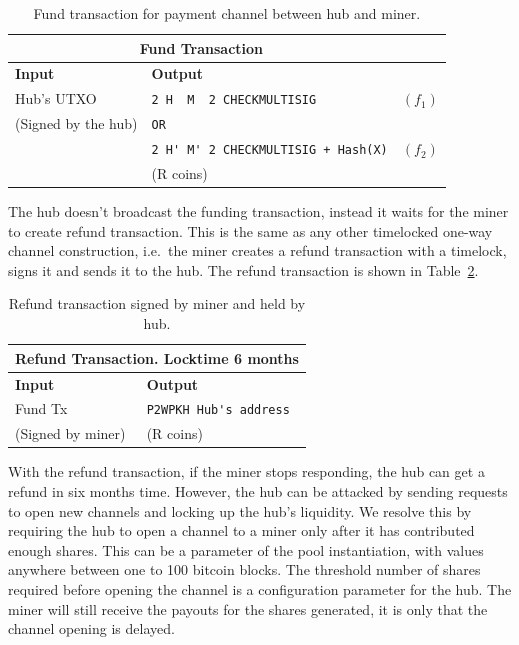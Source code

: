 \documentclass{article}
\begin{document}
\begin{table}
  \centering
  \begin{tabular}{ llr }
    \multicolumn{2}{c}{\bfseries Fund Transaction} \\
    \midrule
    \bfseries Input & \bfseries Output \\
    \midrule
    Hub's UTXO & \verb|2 H  M  2 CHECKMULTISIG| & $(f_1)$ \\
    (Signed by the hub) & \verb|OR| \\
                    & \verb|2 H' M' 2 CHECKMULTISIG + Hash(X)| & $(f_2)$ \\
    & (R coins) \\
    \midrule
  \end{tabular}
  \caption{Fund transaction for payment channel between hub and miner.}\label{fund-tx}
\end{table}


The hub doesn't broadcast the funding transaction, instead it waits
for the miner to create refund transaction. This is the same as any
other timelocked one-way channel construction, i.e.\ the miner creates
a refund transaction with a timelock, signs it and sends it to the
hub. The refund transaction is shown in Table~\ref{refund-tx}.

\begin{table}
  \centering
  \begin{tabular}{ ll }
    \multicolumn{2}{c}{\bfseries Refund Transaction. Locktime 6 months} \\
    \midrule
    \bfseries Input & \bfseries Output \\
    \midrule
    Fund Tx & \verb|P2WPKH Hub's address| \\
    (Signed by miner) & (R coins) \\
    \midrule
  \end{tabular}
  \caption{Refund transaction signed by miner and held by
    hub.}\label{refund-tx}
\end{table}

With the refund transaction, if the miner stops responding, the hub
can get a refund in six months time. However, the hub can be attacked
by sending requests to open new channels and locking up the hub's
liquidity. We resolve this by requiring the hub to open a channel to a
miner only after it has contributed enough shares. This can be a
parameter of the pool instantiation, with values anywhere between one
to 100 bitcoin blocks. The threshold number of shares required before
opening the channel is a configuration parameter for the hub. The
miner will still receive the payouts for the shares generated, it is
only that the channel opening is delayed.
\end{document}
